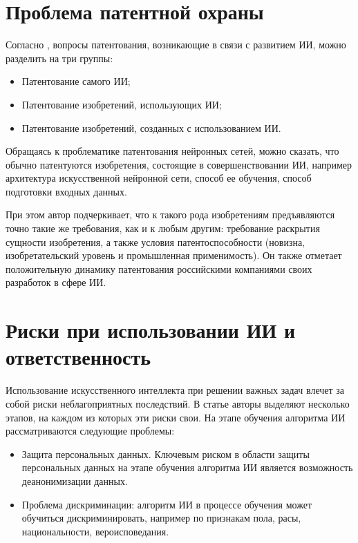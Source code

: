 \newpage

\section{Проблема патентной охраны}
Согласно \cite{trans}, вопросы патентования, возникающие в связи с развитием ИИ, можно разделить на три группы:

\begin{itemize}
\item Патентование самого ИИ;
\item Патентование изобретений, использующих ИИ;
\item Патентование изобретений, созданных с использованием ИИ.
\end{itemize}

Обращаясь к проблематике патентования нейронных сетей, можно сказать,
что обычно патентуются изобретения, состоящие в совершенствовании ИИ, например
архитектура искусственной нейронной сети, способ ее обучения, способ подготовки
входных данных.

При этом автор \cite{trans} подчеркивает, что к такого рода изобретениям предъявляются
точно такие же требования, как и к любым другим: требование раскрытия сущности
изобретения, а также условия патентоспособности (новизна, изобретательский уровень
и промышленная применимость). Он также отметает положительную динамику патентования
российскими компаниями своих разработок в сфере ИИ.
\newpage

\section{Риски при использовании ИИ и ответственность}
Использование искусственного интеллекта при решении важных задач влечет за собой риски неблагоприятных
последствий. В статье \cite{self} авторы выделяют несколько этапов, на каждом из которых эти риски свои.
На этапе обучения алгоритма ИИ рассматриваются следующие проблемы:

\begin{itemize}
\item Защита персональных данных. Ключевым риском в области защиты персональных данных на этапе обучения
алгоритма ИИ является возможность деанонимизации данных.
\item Проблема дискриминации: алгоритм ИИ в процессе обучения может обучиться дискриминировать, например
по признакам пола, расы, национальности, вероисповедания.
\end{itemize}

